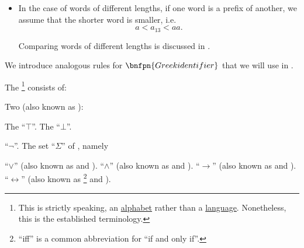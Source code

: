 \begin{remark}
\begin{itemize}
    \item In the case of words of different lengths, if one word is a prefix of another, we assume that the shorter word is smaller, i.e.
    \begin{equation*}
      a < a_{13} < aa.
    \end{equation*}

    Comparing words of different lengths is discussed in .
  \end{itemize}

  We introduce analogous rules for \( \bnfpn{Greek identifier} \) that we will use in .
\end{remark}

\begin{definition}\label{def:propositional_language}
  The \footnote{This is strictly speaking, an \hyperref[def:formal_language]{alphabet} rather than a \hyperref[def:formal_language/language]{language}. Nonetheless, this is the established terminology.} consists of:

  \begin{thmenum}
     Two  (also known as ):
    \begin{thmenum}
       The  \enquote{\( \top \)}.
       The  \enquote{\( \bot \)}.
    \end{thmenum}

      \enquote{\( \neg \)}.
     The set \enquote{\( \Sigma \)} of , namely
    \begin{thmenum}
        \enquote{\( \vee \)} (also known as \hyperref[def:standard_boolean_operators]{} and \hyperref[def:semilattice/join]{}).
        \enquote{\( \wedge \)} (also known as \hyperref[def:standard_boolean_operators]{} and \hyperref[def:semilattice/meet]{}).
        \enquote{\( \rightarrow \)} (also known as  and \hyperref[def:material_implication]{}).
        \enquote{\( \leftrightarrow \)} (also known as \footnote{\enquote{iff} is a common abbreviation for \enquote{if and only if}.} and ).
    \end{thmenum}


\end{thmenum}
\end{definition}
